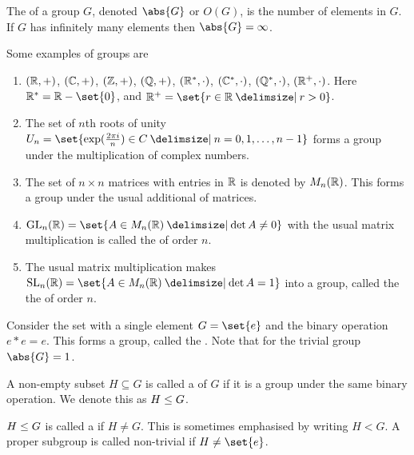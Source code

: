 \documentclass[11pt]{penrose}
\begin{document}
\begin{ndfn}
    The  of a group $G$, denoted $\abs{G}$ or $O(G)$, is the number of elements in $G$. If $G$ has infinitely many elements then $\abs{G} = \infty$.
\end{ndfn}

\begin{egg}
    Some examples of groups are
    \begin{enumerate}
        \item $(\mathbb{R},+)$, $(\mathbb{C},+)$, $(\mathbb{Z},+)$, $(\mathbb{Q},+)$, $(\mathbb{R}^{*},\cdot)$, $(\mathbb{C}^{*},\cdot)$, $(\mathbb{Q}^{*},\cdot)$, $(\mathbb{R}^{+},\cdot)$. Here $\R^{*} = \R - \set{0}$, and $\R^{+} = \set{r \in \R \st r > 0}$.
        \item The set of $n$th roots of unity $U_n = \set{\exp(\frac{2\pi i}{n}) \in C \st n = 0, 1, \dots, n-1}$ forms a group under the multiplication of complex numbers.
        \item The set of $n \times n$ matrices with entries in $\mathbb{R}$ is denoted by $M_{n}(\mathbb{R})$. This forms a group under the usual additional of matrices.
        \item $\GL_{n}(\R) = \set{A \in M_{n}(\R) \st \det A \neq 0}$ with the usual matrix multiplication is called the  of order $n$.
        \item The usual matrix multiplication makes $\SL_{n}(\R) = \set{A \in M_{n}(\R) \st \det A = 1}$ into a group, called the the  of order $n$.
    \end{enumerate}
\end{egg}

\begin{negg}
    Consider the set with a single element $G = \set{e}$ and the binary operation $e * e = e$. This forms a group, called the . Note that for the trivial group $\abs{G} = 1$.
\end{negg}

\begin{ndfn}
    A non-empty subset $H \subseteq G$ is called a  of $G$ if it is a group under the same binary operation. We denote this as $H \mathrel{\leq} G$.
\end{ndfn}

\begin{ndfn}
    $H \mathrel{\leq} G$ is called a  if $H \neq G$. This is sometimes emphasised by writing $H < G$. A proper subgroup is called non-trivial if $H \neq \set{e}$.
\end{ndfn}
\end{document}
